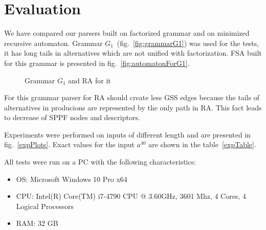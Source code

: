 \documentclass[runningheads,a4paper]{llncs}
\begin{document}





\section{Evaluation}

We have compared our parsers built on factorized grammar and on minimized recursive automaton.
Grammar $G_1$~(fig.~\ref{fig:grammarG1}) was used for the tests, it has long tails in alternatives which are not unified with factorization.
FSA built for this grammar is presented in fig.~\ref{fig:automatonForG1}.

\begin{figure}[ht]   
    \centering

    \caption{Grammar $G_1$ and RA for it}
\end{figure}

For this grammar parser for RA should create less GSS edges because the tails of alternatives in producions
are represented by the only path in RA. This fact leads to decrease of SPPF nodes and descriptors.

Experiments were performed on inputs of different length and are presented in fig.~\ref{expPlots}.
Exact values for the input $a^{40}$ are shown in the table~\ref{expTable}.

All tests were run on a PC with the following characteristics:
\begin{itemize}
    \item OS: Microsoft Windows 10 Pro x64
    \item CPU: Intel(R) Core(TM) i7-4790 CPU @ 3.60GHz, 3601 Mhz, 4 Cores, 4 Logical Processors
    \item RAM: 32 GB
\end{itemize}
\end{document}
